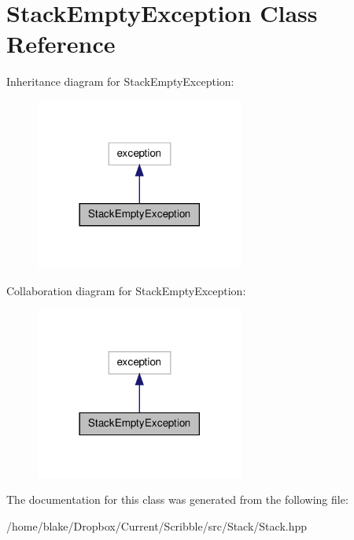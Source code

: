 \hypertarget{class_stack_empty_exception}{\section{Stack\-Empty\-Exception Class Reference}
\label{class_stack_empty_exception}
}


Inheritance diagram for Stack\-Empty\-Exception\-:\nopagebreak
\begin{figure}[H]
\begin{center}
\leavevmode
\includegraphics[width=194pt]{class_stack_empty_exception__inherit__graph}
\end{center}
\end{figure}


Collaboration diagram for Stack\-Empty\-Exception\-:\nopagebreak
\begin{figure}[H]
\begin{center}
\leavevmode
\includegraphics[width=194pt]{class_stack_empty_exception__coll__graph}
\end{center}
\end{figure}


The documentation for this class was generated from the following file\-:\begin{DoxyCompactItemize}
\item 
/home/blake/\-Dropbox/\-Current/\-Scribble/src/\-Stack/Stack.\-hpp\end{DoxyCompactItemize}
